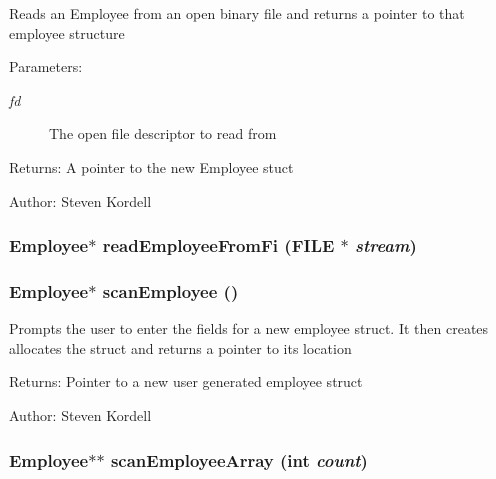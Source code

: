 Reads an Employee from an open binary file and returns a pointer to that employee structure \begin{Desc}
\item[Parameters:]
\begin{description}
\item[{\em fd}]The open file descriptor to read from \end{description}
\end{Desc}
\begin{Desc}
\item[Returns:]A pointer to the new Employee stuct \end{Desc}
\begin{Desc}
\item[Author:]Steven Kordell \end{Desc}
\subsubsection{\setlength{\rightskip}{0pt plus 5cm}\bf{Employee}$\ast$ read\-Employee\-From\-Fi (FILE $\ast$ {\em stream})}\label{employeef_8h_82d94d206e277a7c67ff90d37dc7795f}


\subsubsection{\setlength{\rightskip}{0pt plus 5cm}\bf{Employee}$\ast$ scan\-Employee ()}\label{employeef_8h_9dfe01c30ede04a179b17ad2badca262}


Prompts the user to enter the fields for a new employee struct. It then creates allocates the struct and returns a pointer to its location \begin{Desc}
\item[Returns:]Pointer to a new user generated employee struct \end{Desc}
\begin{Desc}
\item[Author:]Steven Kordell \end{Desc}
\subsubsection{\setlength{\rightskip}{0pt plus 5cm}\bf{Employee}$\ast$$\ast$ scan\-Employee\-Array (int {\em count})}\label{employeef_8h_97f7039a15deadb100a9cfaf38ef9a39}


